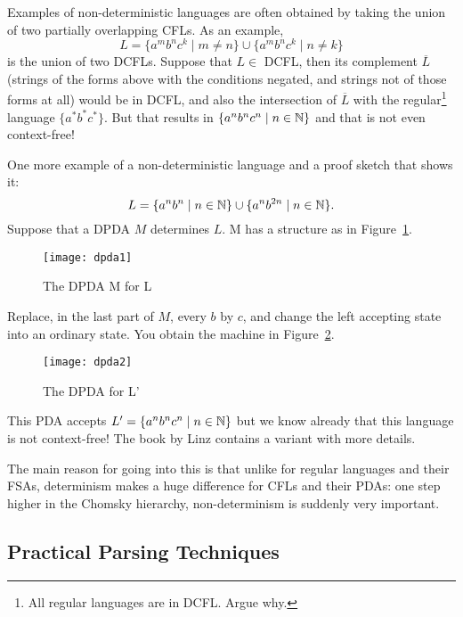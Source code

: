 Examples of non-deterministic languages are often obtained by taking
the union of two partially overlapping CFLs. As an example,
\begin{equation*}
	L = \{a^mb^nc^k\mid m \neq n\} \cup \{a^mb^nc^k\mid n \neq k\}
\end{equation*}
is the union of two DCFLs. Suppose that $L \in$ DCFL, then its complement $\overline{L}$ (strings of the forms above with the conditions negated, and strings not of those forms at all) would be in DCFL, and also the intersection of $\overline{L}$ with the regular\footnote{All regular languages are in DCFL. Argue why.} language
$\{a^*b^*c^*\}$. But that results in $\{a^nb^nc^n\mid n \in \mathbb{N}\}$ and that
is not even context-free!

One more example of a non-deterministic language and a proof sketch
that shows it:
\begin{equation*}
	L = \{a^nb^n\mid n \in \mathbb{N}\} \cup \{a^nb^{2n}\mid n \in \mathbb{N}\}.
\end{equation*}
Suppose that a DPDA $M$ determines $L$. M has a structure as in
Figure~\ref{dpda1}.

\medskip
\begin{figure}[h]
	\centering
	\texttt{[image: dpda1]}
	\caption{The DPDA M for L\label{dpda1}}
\end{figure}

Replace, in the last part of $M$, every $b$ by $c$, and change the left
accepting state into an ordinary state. You obtain the machine in
Figure~\ref{dpda2}.
\medskip

\begin{figure}[h]
	\centering
	\texttt{[image: dpda2]}
	\caption{The DPDA for L'\label{dpda2}}
\end{figure}

This PDA accepts $L' = \{a^nb^nc^n\mid n \in \mathbb{N}\}$ but we know already that this language is not context-free! The book by Linz contains a variant with more details.

The main reason for going into this is that unlike for regular
languages and their FSAs, determinism makes a huge difference for
CFLs and their PDAs: one step higher in the Chomsky hierarchy,
non-determinism is suddenly very important.


\subsection{Practical Parsing Techniques}

